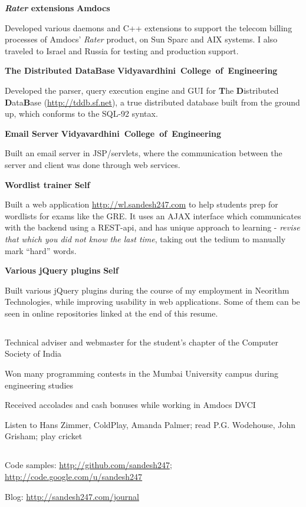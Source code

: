 \documentclass[a4paper,11pt,final]{article}
\newcommand{\resumetitle}[1]{%
  \subsection*{%
    \Large\sc{\textbf{#1}}%
  }%
  
}%
\newcommand{\projexp}[2]{%
  \vspace{12pt}
  \noindent\textbf{{#1}}
  \hfill
  \hbox{\textbf{{#2}}}
  \\ \vspace{-12pt}
}
\newcommand{\resumedescheader}[1]{%
  \bigskip
  \resumetitle{#1}
}%
\begin{document}
\projexp{\textit{Rater} extensions}{Amdocs} 

\noindent Developed various daemons and C++ extensions to support the
telecom billing processes of Amdocs' \textit{Rater} product, on Sun
Sparc and AIX systems. I also traveled to Israel and Russia for
testing and production support.

\projexp{The Distributed DataBase}{Vidyavardhini College of
  Engineering} 

\noindent Developed the parser, query execution engine and GUI for
\textbf{T}he \textbf{D}istributed \textbf{D}ata\textbf{B}ase
(\url{http://tddb.sf.net}), a true distributed database built from the
ground up, which conforms to the SQL-92 syntax.

\projexp{Email Server}{Vidyavardhini College of Engineering} 

\noindent Built an email server in JSP/servlets, where the
communication between the server and client was done through web
services.

\projexp{Wordlist trainer}{Self}

\noindent Built a web application \url{http://wl.sandesh247.com} to
help students prep for wordlists for exams like the GRE. It uses an
AJAX interface which communicates with the backend using a REST-api,
and has unique approach to learning - \textit{revise that which you
  did not know the last time}, taking out the tedium to manually
mark ``hard'' words.

\projexp{Various jQuery plugins}{Self}

\noindent Built various jQuery plugins during the course of my
employment in Neorithm Technologies, while improving usability in web
applications. Some of them can be seen in online repositories linked
at the end of this resume.


\resumedescheader{Extracurricular Activities}
\begin{itemize*}
\item Technical adviser and webmaster for the student's chapter of the
  Computer Society of India
\item Won many programming contests in the Mumbai University campus
  during engineering studies
\item Received accolades and cash bonuses while working in Amdocs DVCI
\item Listen to Hans Zimmer, ColdPlay, Amanda Palmer; read
  P.G. Wodehouse, John Grisham; play cricket
\end{itemize*}

\resumedescheader{Links}
\begin{itemize*}
\item  Code samples: \url{http://github.com/sandesh247}; \url{http://code.google.com/u/sandesh247}
\item  Blog: \url{http://sandesh247.com/journal}
\end{itemize*}
\end{document}
